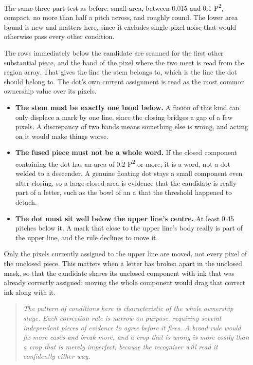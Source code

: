 The same three-part test as before: small area, between 0.015 and 0.1 P\textsuperscript{2}, compact, no more than half a pitch across, and roughly round. The lower area bound is new and matters here, since it excludes single-pixel noise that would otherwise pass every other condition.


The rows immediately below the candidate are scanned for the first other substantial piece, and the band of the pixel where the two meet is read from the region array. That gives the line the stem belongs to, which is the line the dot should belong to. The dot's own current assignment is read as the most common ownership value over its pixels.



\begin{itemize}\setlength\itemsep{0pt}
  \item \textbf{The stem must be exactly one band below.} A fusion of this kind can only displace a mark by one line, since the closing bridges a gap of a few pixels. A discrepancy of two bands means something else is wrong, and acting on it would make things worse.
  \item \textbf{The fused piece must not be a whole word.} If the closed component containing the dot has an area of 0.2 P\textsuperscript{2} or more, it is a word, not a dot welded to a descender. A genuine floating dot stays a small component even after closing, so a large closed area is evidence that the candidate is really part of a letter, such as the bowl of an a that the threshold happened to detach.
  \item \textbf{The dot must sit well below the upper line's centre.} At least 0.45 pitches below it. A mark that close to the upper line's body really is part of the upper line, and the rule declines to move it.
\end{itemize}
Only the pixels currently assigned to the upper line are moved, not every pixel of the unclosed piece. This matters when a letter has broken apart in the unclosed mask, so that the candidate shares its unclosed component with ink that was already correctly assigned: moving the whole component would drag that correct ink along with it.


\begin{quote}\small\itshape The pattern of conditions here is characteristic of the whole ownership stage. Each correction rule is narrow on purpose, requiring several independent pieces of evidence to agree before it fires. A broad rule would fix more cases and break more, and a crop that is wrong is more costly than a crop that is merely imperfect, because the recogniser will read it confidently either way.\end{quote}



